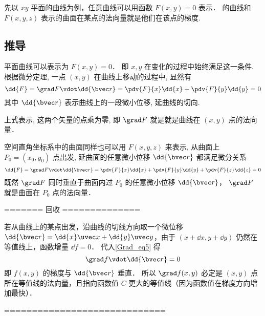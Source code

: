 
\begin{issues}
\issueDraft
\end{issues}


先以 $xy$ 平面的曲线为例，任意曲线可以用函数 $F(x, y) = 0$ 表示． 的曲线和 $F(x, y, z)$ 表示的曲面在某点的法向量就是他们在该点的梯度.

\subsection{推导}

平面曲线可以表示为 $F(x, y) = 0$． 即 $x, y$ 在变化的过程中始终满足这一条件. 根据微分定理, 一点 $(x, y)$ 在曲线上移动的过程中, 显然有
\begin{equation}
\dd{F} = \grad F \vdot \dd{\bvec r} = \pdv{F}{x} \dd{x} + \pdv{F}{y} \dd{y} = 0
\end{equation}
其中 $\dd{\bvec r}$ 表示曲线上的一段微小位移, 延曲线的切向.

上式表示, 这两个矢量的点乘为零, 即 $\grad F$ 就是就是曲线在 $(x,y)$ 点的法向量．

空间直角坐标系中的曲面同样也可以用 $F(x, y, z)$ 来表示, 从曲面上 $P_0 = (x_0, y_0)$ 点出发, 延曲面的任意微小位移 $\dd{\bvec r}$ 都满足微分关系
\begin{equation}
\dd{F} = \grad F \vdot \dd{\bvec r} = \pdv{F}{x} \dd{x} + \pdv{F}{y} \dd{y} + \pdv{F}{z} \dd{z} = 0
\end{equation}
既然 $\grad F$ 同时垂直于曲面内过 $P_0$ 的任意微小位移 $\dd{\bvec r}$， $\grad F$ 就是曲面在 $P_0$ 点的法向量．

======= 回收 ==============

若从曲线上的某点出发，沿曲线的切线方向取一个微位移 $\dd{\bvec r} = \dd{x}\uvec x + \dd{y} \uvec y$，由于 $(x+\dd{x}, y+\dd{y})$ 仍然在等值线上，函数增量 $\dd{f} = 0$． 代入\autoref{Grad_eq5} 得
\begin{equation}
\grad f \vdot \dd{\bvec r} = 0
\end{equation}
即 $f(x,y)$ 的梯度与 $\dd{\bvec r}$ 垂直． 所以 $\grad f(x,y)$ 必定是 $(x,y)$ 点所在等值线的法向量，且指向函数值 $C$ 更大的等值线（因为函数值在梯度方向增加最快）．

=============================
